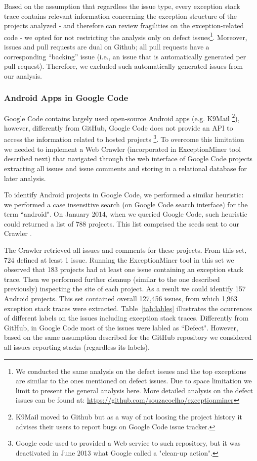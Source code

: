 \documentclass[conference]{IEEEtran}
\begin{document}
Based on the assumption that regardless the issue type, every exception stack
trace contains relevant information concerning the exception structure of the
projects analyzed - and therefore can review fragilities on the exception-related code -  
we opted for not restricting the analysis only on defect
issues\footnote{We conducted the same analysis on the defect issues and the top
exceptions are similar to the ones mentioned on defect issues. Due to space
limitation we limit to present the general analysis here. More detailed analysis
on the defect issues can be found at:
\url{https://github.com/souzacoelho/exceptionminer}}.
 Moreover, issues and pull requests are dual on Github; all pull requests have a corresponding 
``backing'' issue (i.e., an issue that is automatically generated per pull request). Therefore, we excluded such automatically generated
issues from our analysis. 

\subsubsection{Android Apps in Google Code}
Google Code contains largely used open-source Android apps (e.g. K9Mail \footnote{K9Mail moved to Github but as a way of not loosing the project history 
it advises their users to report bugs on Google Code issue tracker.}), however, differently from GitHub, Google Code does not provide an API to access the information related
 to hosted projects \footnote{Google code used to provided a Web service to such repository, but it was deactivated in June 2013 what Google called a "clean-up action".}.
To overcome this limitation we needed to implement a Web Crawler (incorporated in ExceptionMiner tool described next) that navigated 
through the web interface of Google Code projects extracting all issues and issue comments and storing in a relational database for later analysis.

To identify Android projects in Google Code, we performed a similar heuristic: we performed a case insensitive search 
(on Google Code search interface) for the term ``android". On January 2014, when we queried Google Code, such heuristic could
 returned a list of 788  projects. This list comprised the seeds sent to our Crawler .

The Crawler retrieved all issues and comments for these projects.
From this set, 724 defined at least 1 issue. Running the ExceptionMiner tool 
 in this set we observed that 183 projects had at least one issue containing an exception stack trace.
 Then we performed further cleanup (similar to the one described previously) inspecting the site 
of each project. As a result we could identify 157 Android projects.  This set contained overall 127,456 issues,
 from which 1,963 exception stack traces were extracted. Table~\ref{tab:lables} illustrates the ocurrences of different labels 
on the issues including exception stack traces. Differently from GitHub, in Google Code most of 
the issues were labled as ``Defect". However, based on the same assumption described for the GitHub repository
 we considered all issues reporting stacks (regardless its labels).
\end{document}

